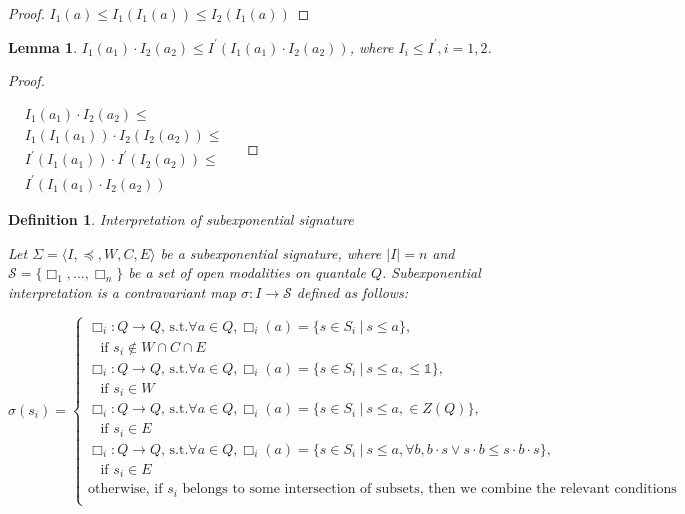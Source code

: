 \documentclass[a4paper]{article}
\newtheorem{lemma}{Lemma}
\newtheorem{defin}{Definition}
\begin{document}
\begin{proof}
  $I_1 (a) \leq I_1 (I_1 (a)) \leq I_2 (I_1 (a))$
\end{proof}

\begin{lemma}
  $I_1(a_1) \cdot I_2(a_2) \leq I^{'} (I_1(a_1) \cdot I_2(a_2))$, where $I_i \leq I^{'}, i = 1,2$.
\end{lemma}

\begin{proof}
$ $

  $\begin{array}{lll}
  &I_1(a_1) \cdot I_2(a_2) \leq & \\
  &I_1 (I_1 (a_1)) \cdot I_2 (I_2 (a_2)) \leq & \\
  &I^{'} (I_1 (a_1)) \cdot I^{'} (I_2 (a_2)) \leq & \\
  &I^{'}(I_1 (a_1) \cdot I_2 (a_2))&
  \end{array}$
\end{proof}

\begin{defin} Interpretation of subexponential signature

  Let $\Sigma = \langle I, \preceq, W, C, E \rangle$ be a subexponential signature, where $|I| = n$ and
  $\mathcal{S} = \{ \Box_1, \dots, \Box_n \}$ be a set of open modalities on quantale $Q$.
  Subexponential interpretation is a contravariant map $\sigma : I \to \mathcal{S}$ defined as follows:

  $\sigma(s_i) = \begin{cases}
  \Box_i : Q \to Q \text{, s.t.} \forall a \in Q, \Box_i(a) = \{ s \in S_i \: | \: s \leq a\},
  \\ \:\:\:\: \text{if $s_i \notin W \cap C \cap E$} \\
  \Box_i : Q \to Q \text{, s.t.} \forall a \in Q, \Box_i(a) = \{ s \in S_i \: | \: s \leq a, \leq \mathds{1}\},
  \\ \:\:\:\: \text{if $s_i \in W$} \\
  \Box_i : Q \to Q \text{, s.t.} \forall a \in Q, \Box_i(a) = \{ s \in S_i \: | \: s \leq a, \in Z(Q) \},
  \\ \:\:\:\: \text{if $s_i \in E$} \\
  \Box_i : Q \to Q \text{, s.t.} \forall a \in Q, \Box_i(a) = \{ s \in S_i \: | \: s \leq a, \forall b, b \cdot s \vee s \cdot b \leq s \cdot b \cdot s \},
  \\ \:\:\:\: \text{if $s_i \in E$} \\
  \text{otherwise, if $s_i$ belongs to some intersection of subsets, then we combine the relevant conditions } \\
  \end{cases}$
\end{defin}
\end{document}
